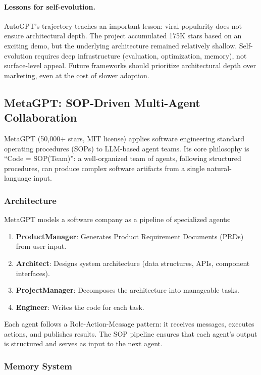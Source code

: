 \paragraph{Lessons for self-evolution.}
AutoGPT's trajectory teaches an important lesson: viral popularity does not ensure architectural depth. The project accumulated 175K stars based on an exciting demo, but the underlying architecture remained relatively shallow. Self-evolution requires deep infrastructure (evaluation, optimization, memory), not surface-level appeal. Future frameworks should prioritize architectural depth over marketing, even at the cost of slower adoption.


\subsection{MetaGPT: SOP-Driven Multi-Agent Collaboration}

MetaGPT (50,000+ stars, MIT license) applies software engineering standard operating procedures (SOPs) to LLM-based agent teams. Its core philosophy is ``Code = SOP(Team)'': a well-organized team of agents, following structured procedures, can produce complex software artifacts from a single natural-language input.

\subsubsection{Architecture}

MetaGPT models a software company as a pipeline of specialized agents:
\begin{enumerate}
    \item \textbf{ProductManager}: Generates Product Requirement Documents (PRDs) from user input.
    \item \textbf{Architect}: Designs system architecture (data structures, APIs, component interfaces).
    \item \textbf{ProjectManager}: Decomposes the architecture into manageable tasks.
    \item \textbf{Engineer}: Writes the code for each task.
\end{enumerate}

Each agent follows a Role-Action-Message pattern: it receives messages, executes actions, and publishes results. The SOP pipeline ensures that each agent's output is structured and serves as input to the next agent.

\subsubsection{Memory System}

